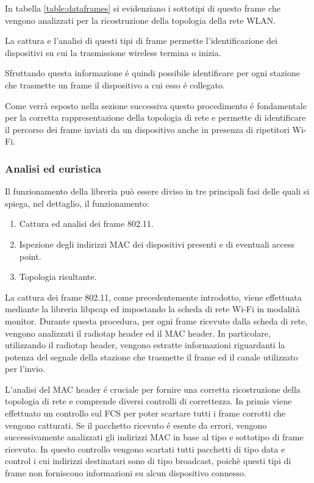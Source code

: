 In tabella \ref{table:dataframes} si evidenziano i sottotipi di questo frame che vengono analizzati per la ricostruzione della topologia della rete WLAN.

La cattura e l'analisi di questi tipi di frame permette l'identificazione dei dispositivi su cui la trasmissione wireless termina o inizia.

Sfruttando questa informazione \'e quindi possibile identificare per ogni stazione che trasmette un frame il dispositivo a cui esso \'e collegato.

Come verr\`a esposto nella sezione successiva questo procedimento \'e fondamentale per la corretta rappresentazione della topologia di rete e permette di identificare il percorso dei frame inviati da un dispositivo anche in presenza di ripetitori Wi-Fi.

\subsubsection{Analisi ed euristica}

Il funzionamento della libreria pu\`o essere diviso in tre principali fasi delle quali si  spiega, nel dettaglio, il funzionamento:

\begin{enumerate}
	\item Cattura ed analisi dei frame 802.11.
	\item Ispezione degli indirizzi MAC dei dispositivi presenti e di eventuali access point. 
	\item Topologia risultante.
\end{enumerate}

La cattura dei frame 802.11, come precedentemente introdotto, viene effettuata mediante la libreria libpcap ed impostando la scheda di rete Wi-Fi in modalit\`a monitor.
Durante questa procedura, per ogni frame ricevuto dalla scheda di rete, vengono analizzati il radiotap header ed il MAC header.
In particolare, utilizzando il radiotap header, vengono estratte informazioni riguardanti la potenza del segnale della stazione che trasmette il frame ed il canale utilizzato per l'invio.

L'analisi del MAC header \'e cruciale per fornire una corretta ricostruzione della topologia di rete e comprende diversi controlli di correttezza.
In primis viene effettuato un controllo sul FCS per poter scartare tutti i frame corrotti che vengono catturati.
Se il pacchetto ricevuto \'e esente da errori, vengono successivamente analizzati gli indirizzi MAC in base al tipo e sottotipo di frame ricevuto.
In questo controllo vengono scartati tutti pacchetti di tipo data e control i cui indirizzi destinatari sono di tipo broadcast, poich\`e questi tipi di frame non forniscono informazioni su alcun dispositivo connesso.

